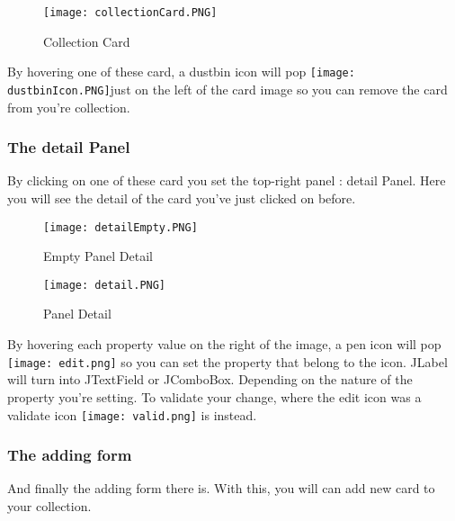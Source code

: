 \documentclass{article}
\begin{document}
\begin{figure}[htbp]
\centering
\texttt{[image: collectionCard.PNG]}
\caption{Collection Card}
\end{figure}

By hovering one of these card, a dustbin icon will pop
\texttt{[image: dustbinIcon.PNG]}just on the left of the card
image so you can remove the card from you're collection.

\subsubsection{The detail Panel}\label{c---the-detail-panel}

By clicking on one of these card you set the top-right panel : detail
Panel. Here you will see the detail of the card you've just clicked on
before.

\begin{figure}[htbp]
    \centering
    \begin{minipage}{.5\textwidth}
        \centering
        \texttt{[image: detailEmpty.PNG]}
        \caption{Empty Panel Detail}
    \end{minipage}%
    \begin{minipage}{.5\textwidth}
        \centering
         \texttt{[image: detail.PNG]}
         \caption{Panel Detail}
    \end{minipage}
\end{figure}

By hovering each property value on the right of the image, a pen icon will pop \texttt{[image: edit.png]} so you can set the property
that belong to the icon. JLabel will turn into JTextField or JComboBox. Depending on the nature of the property you're setting. To validate your change, where the edit icon was a validate icon
\texttt{[image: valid.png]} is instead.

\subsubsection{The adding form}\label{d---the-adding-form}
And finally the adding form there is. With this, you will can add new card to your collection.
\end{document}

